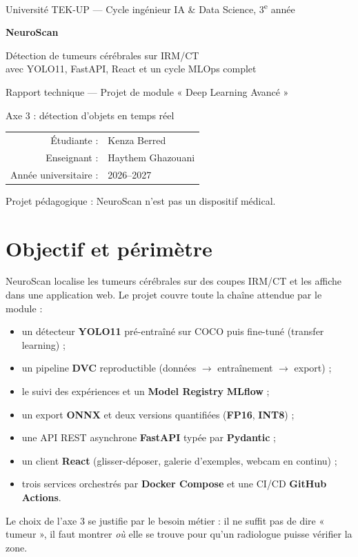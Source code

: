 \documentclass[11pt,a4paper]{article}
\begin{document}
\begin{titlepage}
  \centering
  {\large Université TEK-UP --- Cycle ingénieur IA \& Data Science, 3\textsuperscript{e} année\par}
  \vspace{2.5cm}
  {\Huge\bfseries NeuroScan\par}
  \vspace{0.4cm}
  {\Large Détection de tumeurs cérébrales sur IRM/CT\\ avec YOLO11, FastAPI, React et un cycle MLOps complet\par}
  \vspace{1.2cm}
  {\large Rapport technique --- Projet de module « Deep Learning Avancé »\par}
  {\large Axe 3 : détection d'objets en temps réel\par}
  \vfill
  \begin{tabular}{rl}
    Étudiante : & Kenza Berred \\
    Enseignant : & Haythem Ghazouani \\
    Année universitaire : & 2026--2027 \\
  \end{tabular}
  \vspace{1.5cm}

  {\small Projet pédagogique : NeuroScan n'est pas un dispositif médical.\par}
\end{titlepage}

\tableofcontents
\newpage

\section{Objectif et périmètre}
NeuroScan localise les tumeurs cérébrales sur des coupes IRM/CT et les affiche dans une application
web. Le projet couvre toute la chaîne attendue par le module :
\begin{itemize}
  \item un détecteur \textbf{YOLO11} pré-entraîné sur COCO puis fine-tuné (transfer learning) ;
  \item un pipeline \textbf{DVC} reproductible (données $\rightarrow$ entraînement $\rightarrow$ export) ;
  \item le suivi des expériences et un \textbf{Model Registry} \textbf{MLflow} ;
  \item un export \textbf{ONNX} et deux versions quantifiées (\textbf{FP16}, \textbf{INT8}) ;
  \item une API REST asynchrone \textbf{FastAPI} typée par \textbf{Pydantic} ;
  \item un client \textbf{React} (glisser-déposer, galerie d'exemples, webcam en continu) ;
  \item trois services orchestrés par \textbf{Docker Compose} et une CI/CD \textbf{GitHub Actions}.
\end{itemize}
Le choix de l'axe 3 se justifie par le besoin métier : il ne suffit pas de dire « tumeur », il
faut montrer \emph{où} elle se trouve pour qu'un radiologue puisse vérifier la zone.
\end{document}
